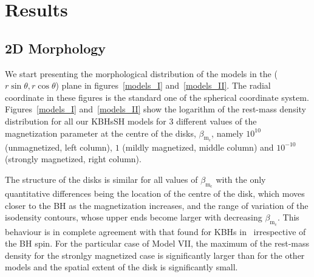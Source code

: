 \documentclass[twocolumn,aps,showpacs,showkeys,prd,superscriptaddress,byrevtex, amsmath]{revtex4-1}
\begin{document}
\section{Results}
\label{results}


\subsection{2D Morphology}

We start presenting the morphological distribution of the models in the ($r\sin\theta, r\cos\theta$) plane in figures~\ref{models_I} and~\ref{models_II}. The radial coordinate in these figures is the standard one of the spherical coordinate system.
Figures~\ref{models_I} and~\ref{models_II} show the logarithm of the rest-mass density distribution for all our KBHsSH models for 3 different values of the magnetization parameter at the centre of the disks, $\beta_{\mathrm{m_c}}$, namely $10^{10}$ (unmagnetized, left column), $1$ (mildly magnetized, middle column) and $10^{-10}$ (strongly magnetized, right column). 

The structure of the disks is similar for all values of $\beta_{\mathrm{m_c}}$ with the only quantitative differences being the location of the centre of the disk, which moves closer to the BH as the magnetization increases, and the range of variation of the isodensity contours, whose upper ends become larger with decreasing $\beta_{\mathrm{m_c}}$. This behaviour is in complete agreement with that found for KBHs in~\cite{Gimeno-Soler:2017} irrespective of the BH spin. For the particular case of Model VII, the maximum of the rest-mass density for the stronlgy magnetized case is significantly larger than for the other models and the spatial extent of the disk is significantly small. 
\end{document}
